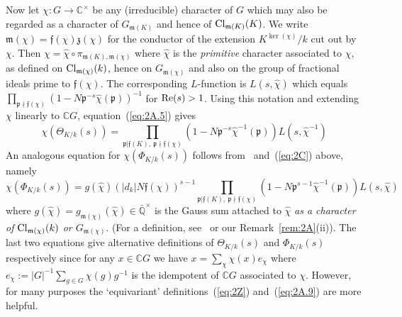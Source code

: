 \documentclass[12pt]{article}
\newcounter{rem}[section]%
\newcommand{\barbbQ}{\ensuremath{\bar{\bbQ}}}
\newcommand{\bbC}{\ensuremath{\mathbb{C}}}
\newcommand{\bbQ}{\ensuremath{\mathbb{Q}}}
\newcommand{\beql}[1]{\begin{equation}\label{#1}}
\newcommand{\Cl}{{\rm Cl}}
\newcommand{\eeq}{\end{equation}}
\newcommand{\ff}{\ensuremath{\mathfrak{f}}}
\newcommand{\fm}{\ensuremath{\mathfrak{m}}}
\newcommand{\fp}{\ensuremath{\mathfrak{p}}}
\newcommand{\fz}{\ensuremath{\mathfrak{z}}}
\newcommand{\inv}{^{-1}}%
\newcommand{\ndiv}{\nmid}
\newcommand{\refeq}[1]{~(\ref{eq:#1})}
\newcommand{\rem}{\refstepcounter{rem}\noindent{\sc Remark \therem}}%
\renewcommand{\therem}{\thesection.\arabic{rem}}
\newcommand{\PhiKks}{\ensuremath{\Phi_{K/k}(s)}}
\begin{document}
Now let $\chi:G\rightarrow\bbC^\times$ be any (irreducible) character of $G$
which may also be regarded as a character of $G_{\fm(K)}$ and hence
of $\Cl_{\fm(K)}(K)$. We write $\fm(\chi)=\ff(\chi)\fz(\chi)$ for the
conductor of the extension $K^{\ker(\chi)}/k$ cut out by
$\chi$. Then $\chi=\hat{\chi}\circ \pi_{\fm(K),\fm(\chi)}$ where
$\hat{\chi}$ is the \emph{primitive} character associated to $\chi$, as defined on
$\Cl_{\fm(\chi)}(k)$, hence on $G_{\fm(\chi)}$ and also on the group
of fractional ideals prime to $\ff(\chi)$. The corresponding $L$-function
is $L(s,\hat{\chi})$ which equals
$\prod_{\fp\ndiv\ff(\chi)}(1-N\fp^{-s}\hat{\chi}(\fp))\inv$ for ${\rm Re}(s)>1$.
Using this notation and extending $\chi$ linearly to $\bbC G$, equation\refeq{2A.5} gives
\beql{eq:2D}
\chi(\Theta_{K/k}(s))=\prod_{\fp|\ff(K),\ \fp\ndiv\ff(\chi)}
(1-N\fp^{-s}\hat{\chi}\inv(\fp)) L(s,\hat{\chi}\inv)
\eeq
An analogous equation for $\chi(\PhiKks)$
follows from~\cite[Thm.~3.3]{twizas} and\refeq{2C} above, namely
\beql{eq:2E}
\chi(\Phi_{K/k}(s))=g(\hat{\chi})(|d_k|N\ff(\chi))^{s-1}
\prod_{\fp|\ff(K),\ \fp\ndiv\ff(\chi)}
(1-N\fp^{s-1}\hat{\chi}\inv(\fp)) L(s,\hat{\chi})
\eeq
where $g(\hat{\chi})=g_{\fm(\chi)}(\hat{\chi})\in\barbbQ^\times$ is the Gauss
sum attached to $\hat{\chi}$ \emph{as a character of $\Cl_{\fm(\chi)}(k)$ or
$G_{\fm(\chi)}$}. (For a definition, see~\cite[\S 6.4]{twizas} or
our Remark~\ref{rem:2A}(ii)).
The last two equations give alternative definitions
of $\Theta_{K/k}(s)$ and $\Phi_{K/k}(s)$ respectively
since for any $x\in\bbC G$ we have $x=\sum_\chi\chi(x)e_\chi$
where $e_\chi:=|G|\inv\sum_{g\in G}\chi(g)g\inv$ is the idempotent of $\bbC G$
associated to $\chi$. However, for many purposes the
`equivariant' definitions\refeq{2Z} and\refeq{2A.9} are more helpful.
\end{document}
